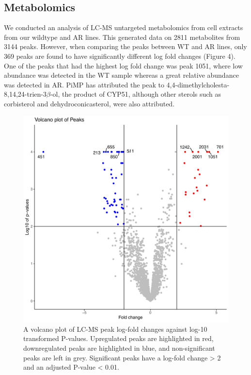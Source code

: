 \documentclass{bioinfo}
\begin{document}
\subsection{Metabolomics}

We conducted an analysis of LC-MS untargeted metabolomics from cell
extracts from our wildtype and AR lines. This generated data on 2811
metabolites from 3144 peaks. However, when comparing the peaks between
WT and AR lines, only 369 peaks are found to have significantly
different log fold changes (Figure 4). One of the peaks that had the
highest log fold change was peak 1051, where low abundance was detected
in the WT sample whereas a great relative abundance was detected in AR.
PiMP has attributed the peak to
4,4-dimethylcholesta-8,14,24-trien-3\(\beta\)-ol, the product of CYP51,
although other sterols such as corbisterol and dehydroconicasterol, were
also attributed.\\

\begin{figure}
\includegraphics[width=1\linewidth]{volcano} \caption{A volcano plot of LC-MS peak log-fold changes against log-10 transformed P-values. Upregulated peaks are highlighted in red, downregulated peaks are highlighted in blue, and non-significant peaks are left in grey. Significant peaks have a log-fold change > 2 and an adjusted P-value < 0.01. }\label{fig:figure2}
\end{figure}
\end{document}
